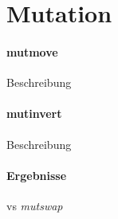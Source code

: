 \section{Mutation}\label{mutation}


\paragraph{mutmove}
Beschreibung

\paragraph{mutinvert}
Beschreibung

\paragraph{Ergebnisse}
vs \emph{mutswap}







